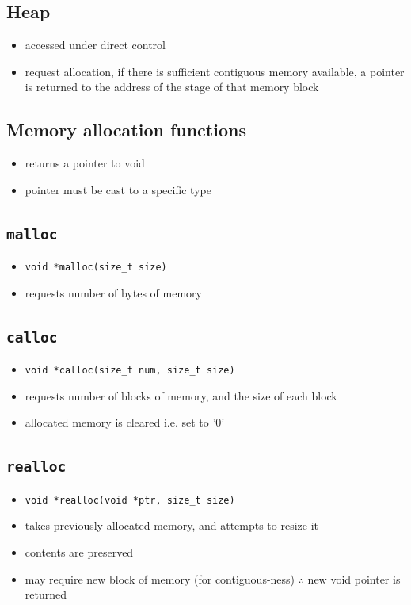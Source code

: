 \documentclass[10pt, multicolumn, a4paper]{article}
\begin{document}
\begin{multicols}{2}
	\subsection*{Heap}
	\begin{itemize}
	\item accessed under direct control
	\item request allocation, if there is sufficient contiguous memory available, a pointer is returned to the address of the stage of that memory block
	\end{itemize}
	\subsection*{Memory allocation functions}
	\begin{itemize}
	\item returns a pointer to void 
	\item pointer must be cast to a specific type
	\end{itemize}
	\subsection*{\texttt{malloc}}
	\begin{itemize}
	\item \verb|void *malloc(size_t size)|
	\item requests number of bytes of memory
	\end{itemize}
	\subsection*{\texttt{calloc}}
	\begin{itemize}
	\item \verb|void *calloc(size_t num, size_t size)|
	\item requests number of blocks of memory, and the size of each block
	\item allocated memory is cleared i.e. set to '0'
	\end{itemize}
	\subsection*{\texttt{realloc}}
	\begin{itemize}
	\item \verb|void *realloc(void *ptr, size_t size)|
	\item takes previously allocated memory, and attempts to resize it
	\item contents are preserved
	\item may require new block of memory (for contiguous-ness) $\therefore$ new void pointer is returned
	\end{itemize}

\end{multicols}
\end{document}
